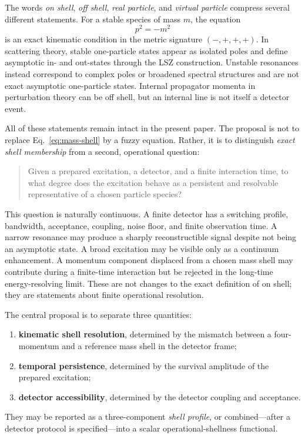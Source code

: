 \documentclass[11pt]{article}
\theoremstyle{remark}
\begin{document}
The words \emph{on shell}, \emph{off shell}, \emph{real particle}, and \emph{virtual particle} compress several different statements. For a stable species of mass $m$, the equation
\begin{equation}
  p^2=-m^2
  \label{eq:mass-shell}
\end{equation}
is an exact kinematic condition in the metric signature $(-,+,+,+)$. In scattering theory, stable one-particle states appear as isolated poles and define asymptotic in- and out-states through the LSZ construction. Unstable resonances instead correspond to complex poles or broadened spectral structures and are not exact asymptotic one-particle states. Internal propagator momenta in perturbation theory can be off shell, but an internal line is not itself a detector event.

All of these statements remain intact in the present paper. The proposal is not to replace Eq.~\eqref{eq:mass-shell} by a fuzzy equation. Rather, it is to distinguish \emph{exact shell membership} from a second, operational question:
\begin{quote}
Given a prepared excitation, a detector, and a finite interaction time, to what degree does the excitation behave as a persistent and resolvable representative of a chosen particle species?
\end{quote}

This question is naturally continuous. A finite detector has a switching profile, bandwidth, acceptance, coupling, noise floor, and finite observation time. A narrow resonance may produce a sharply reconstructible signal despite not being an asymptotic state. A broad excitation may be visible only as a continuum enhancement. A momentum component displaced from a chosen mass shell may contribute during a finite-time interaction but be rejected in the long-time energy-resolving limit. These are not changes to the exact definition of on shell; they are statements about finite operational resolution.

The central proposal is to separate three quantities:
\begin{enumerate}[label=(\roman*)]
  \item \textbf{kinematic shell resolution}, determined by the mismatch between a four-momentum and a reference mass shell in the detector frame;
  \item \textbf{temporal persistence}, determined by the survival amplitude of the prepared excitation;
  \item \textbf{detector accessibility}, determined by the detector coupling and acceptance.
\end{enumerate}
They may be reported as a three-component \emph{shell profile}, or combined---after a detector protocol is specified---into a scalar operational-shellness functional.
\end{document}
